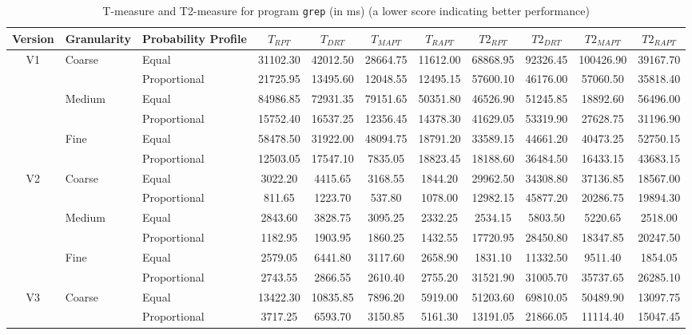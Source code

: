 \documentclass[10pt,journal,compsoc]{IEEEtran}
\begin{document}
\begin{table*}
\caption{T-measure and T2-measure for program \texttt{grep} (in ms) (a lower score indicating better performance)}
\label{tab:Tgrep}
\centering
\begin{tabular}{|c|l|l|c|c|c|c|c|c|c|c|} \hline
Version	& Granularity	& Probability Profile	& $T_{RPT}$	& $T_{DRT}$	& $T_{MAPT}$	& $T_{RAPT}$	& $T2_{RPT}$	& $T2_{DRT}$	& $T2_{MAPT}$	 & $T2_{RAPT}$	\\ \hline
V1	& Coarse	& Equal	& 31102.30	& 42012.50	& 28664.75	& 11612.00	& 68868.95	& 92326.45	& 100426.90	& 39167.70	 \\ \cline{3-11}
	& 	& Proportional	& 21725.95	& 13495.60	& 12048.55	& 12495.15	& 57600.10	& 46176.00	& 57060.50	& 35818.40	 \\ \cline{2-11}
	& Medium	& Equal	& 84986.85	& 72931.35	& 79151.65	& 50351.80	& 46526.90	& 51245.85	& 18892.60	& 56496.00	 \\ \cline{3-11}
	& 	& Proportional	& 15752.40	& 16537.25	& 12356.45	& 14378.30	& 41629.05	& 53319.90	& 27628.75	& 31196.90	 \\ \cline{2-11}
	& Fine	& Equal	& 58478.50	& 31922.00	& 48094.75	& 18791.20	& 33589.15	& 44661.20	& 40473.25	& 52750.15	 \\ \cline{3-11}
	& 	& Proportional	& 12503.05	& 17547.10	& 7835.05	& 18823.45	& 18188.60	& 36484.50	& 16433.15	& 43683.15	 \\ \hline
V2	& Coarse	& Equal	& 3022.20	& 4415.65	& 3168.55	& 1844.20	& 29962.50	& 34308.80	& 37136.85	& 18567.00	 \\ \cline{3-11}
	& 	& Proportional	& 811.65	& 1223.70	& 537.80	& 1078.00	& 12982.15	& 45877.20	& 20286.75	& 19894.30	 \\ \cline{2-11}
	& Medium	& Equal	& 2843.60	& 3828.75	& 3095.25	& 2332.25	& 2534.15	& 5803.50	& 5220.65	& 2518.00	 \\ \cline{3-11}
	& 	& Proportional	& 1182.95	& 1903.95	& 1860.25	& 1432.55	& 17720.95	& 28450.80	& 18347.85	& 20247.50	 \\ \cline{2-11}
	& Fine	& Equal	& 2579.05	& 6441.80	& 3117.60	& 2658.90	& 1831.10	& 11332.50	& 9511.40	& 1854.05	 \\ \cline{3-11}
	& 	& Proportional	& 2743.55	& 2866.55	& 2610.40	& 2755.20	& 31521.90	& 31005.70	& 35737.65	& 26285.10	 \\ \hline
V3	& Coarse	& Equal	& 13422.30	& 10835.85	& 7896.20	& 5919.00	& 51203.60	& 69810.05	& 50489.90	& 13097.75	 \\ \cline{3-11}
	& 	& Proportional	& 3717.25	& 6593.70	& 3150.85	& 5161.30	& 13191.05	& 21866.05	& 11114.40	& 15047.45	 \\ \cline{2-11}

\end{tabular}
\end{table*}
\end{document}
